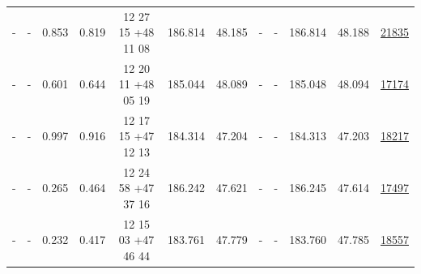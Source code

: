 \documentclass{article}
\begin{document}
\begin{landscape}
\begin{longtable}{c|c|c|c|c|c|c|c|c|c|c|c}
- & - & 0.853 & 0.819 & 12 27 15 +48 11 08 &  186.814 & 48.185 &  - & - & 186.814 & 48.188 & \href{http://banana.transientskp.org/r4/vlo_KmeulenTrap4P23/runningcatalog/21835}{21835}  \\
- & - & 0.601 & 0.644 & 12 20 11 +48 05 19 &  185.044 & 48.089 &  - & - & 185.048 & 48.094 & \href{http://banana.transientskp.org/r4/vlo_KmeulenTrap4P23/runningcatalog/17174}{17174}  \\
- & - & 0.997 & 0.916 & 12 17 15 +47 12 13 &  184.314 & 47.204 &  - & - & 184.313 & 47.203 & \href{http://banana.transientskp.org/r4/vlo_KmeulenTrap4P23/runningcatalog/18217}{18217}  \\
- & - & 0.265 & 0.464 & 12 24 58 +47 37 16 &  186.242 & 47.621 &  - & - & 186.245 & 47.614 & \href{http://banana.transientskp.org/r4/vlo_KmeulenTrap4P23/runningcatalog/17497}{17497}  \\
- & - & 0.232 & 0.417 & 12 15 03 +47 46 44 &  183.761 & 47.779 &  - & - & 183.760 & 47.785 & \href{http://banana.transientskp.org/r4/vlo_KmeulenTrap4P23/runningcatalog/18557}{18557}  \\
\end{longtable}

\end{landscape}
\end{document}
